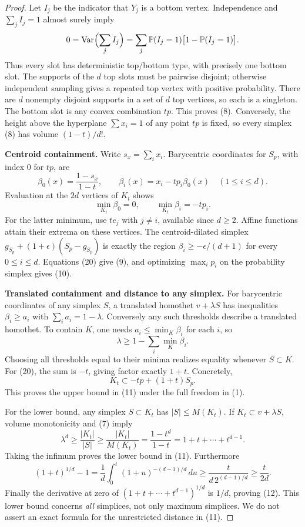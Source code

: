 \documentclass[11pt]{article}
\begin{document}
\begin{proof}
Let $I_j$ be the indicator that $Y_j$ is a bottom vertex. Independence and
$\sum_j I_j=1$ almost surely imply
\[
 0=\operatorname{Var}\Bigl(\sum_j I_j\Bigr)
  =\sum_j \mathbb P(I_j=1)\bigl[1-\mathbb P(I_j=1)\bigr].
\]
Thus every slot has deterministic top/bottom type, with precisely one bottom
slot. The supports of the $d$ top slots must be pairwise disjoint; otherwise
independent sampling gives a repeated top vertex with positive probability.
There are $d$ nonempty disjoint supports in a set of $d$ top vertices, so
each is a singleton. The bottom slot is any convex combination $tp$.
This proves (8). Conversely, the height above the hyperplane
$\sum x_i=1$ of any point $tp$ is fixed, so every simplex (8) has volume
$(1-t)/d!$.

\medskip\noindent\textbf{Centroid containment.}
Write $s_x=\sum_i x_i$. Barycentric coordinates for $S_p$, with index $0$
for $tp$, are
\[
 \beta_0(x)=\frac{1-s_x}{1-t},\qquad
 \beta_i(x)=x_i-tp_i\beta_0(x)\quad(1\le i\le d).
 \tag{19}
\]
Evaluation at the $2d$ vertices of $K_t$ shows
\[
 \min_{K_t}\beta_0=0,\qquad \min_{K_t}\beta_i=-tp_i.
 \tag{20}
\]
For the latter minimum, use $te_j$ with $j\ne i$, available since $d\ge2$.
Affine functions attain their extrema on these vertices.
The centroid-dilated simplex $g_{S_p}+(1+\epsilon)(S_p-g_{S_p})$
is exactly the region $\beta_i\ge-\epsilon/(d+1)$ for every
$0\le i\le d$. Equations (20) give (9), and optimizing $\max_i p_i$
on the probability simplex gives (10).

\medskip\noindent\textbf{Translated containment and distance to any simplex.}
For barycentric coordinates of any simplex $S$, a translated homothet
$v+\lambda S$ has inequalities $\beta_i\ge a_i$ with
$\sum_i a_i=1-\lambda$. Conversely any such thresholds describe a
translated homothet. To contain $K$, one needs
$a_i\le\min_K\beta_i$ for each $i$, so
\[
 \lambda\ge1-\sum_i\min_K\beta_i.
 \tag{21}
\]
Choosing all thresholds equal to their minima realizes equality whenever
$S\subset K$. For (20), the sum is $-t$, giving factor exactly $1+t$.
Concretely,
\[
 K_t\subset -tp+(1+t)S_p.
 \tag{22}
\]
This proves the upper bound in (11) under the full freedom in (1).

For the lower bound, any simplex $S\subset K_t$ has $|S|\le M(K_t)$.
If $K_t\subset v+\lambda S$, volume monotonicity and (7) imply
\[
 \lambda^d\ge\frac{|K_t|}{|S|}
 \ge\frac{|K_t|}{M(K_t)}
 =\frac{1-t^d}{1-t}=1+t+\cdots+t^{d-1}.
 \tag{23}
\]
Taking the infimum proves the lower bound in (11). Furthermore
\[
 (1+t)^{1/d}-1
 =\frac1d\int_0^t(1+u)^{-(d-1)/d}\,du
 \ge\frac{t}{d\,2^{(d-1)/d}}\ge\frac{t}{2d}.
\]
Finally the derivative at zero of
$(1+t+\cdots+t^{d-1})^{1/d}$ is $1/d$, proving (12).
This lower bound concerns \emph{all} simplices, not only maximum simplices.
We do not assert an exact formula for the unrestricted distance in (11).


\end{proof}
\end{document}
